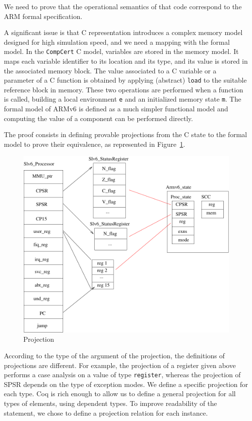 \documentclass[a4paper, conference]{IEEEtran}
\newcommand{\compcert}{\texttt{CompCert}\xspace}
\newcommand{\compcert}{Compcert\xspace}
\begin{document}
We need to prove that the operational semantics of that code
correspond to the ARM formal specification.

A significant issue is that C representation introduces a complex
memory model designed for high simulation speed, and we need a mapping
with the formal model. In the \compcert C model, variables are stored
in the memory model.  It maps each variable identifier to its location
and its type, and its value is stored in the associated memory block.
The value associated to a C variable or a parameter of a C function is
obtained by applying (abstract) \texttt{load} to the suitable
reference block in memory.  These two operations are performed when a
function is called, building a local environment \texttt{e} and an
initialized memory state \texttt{m}. The formal model of ARMv6 is
defined as a much simpler functional model and computing the value of
a component can be performed directly.

The proof consists in defining provable projections from the C state
to the formal model to prove their equivalence, as represented in
Figure~\ref{fig:proj}.

\begin{figure}[h]
\hfil\includegraphics[width=.75\linewidth]{fig/projection.pdf}
\caption{Projection}
\label{fig:proj}
\end{figure}

According to the type of the argument of the
projection, the definitions of projections are different.  For
example, the projection of a register given above performs a case
analysis on a value of type \texttt{register}, whereas the projection
of SPSR depends on the type of exception modes.  We define a specific
projection for each type.  Coq is rich enough to allow us to define a
general projection for all types of elements, using dependent
types. To improve readability of the statement, we chose to
define a projection relation for each instance.
\end{document}
